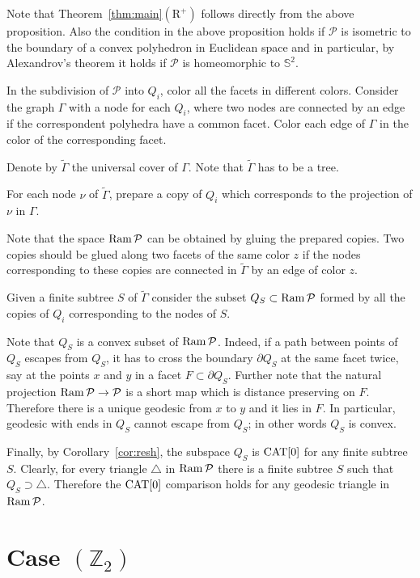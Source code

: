 \documentclass[oneside,a4paper]{article}
\begin{document}
Note that Theorem~\ref{thm:main}$(\mathrm{R}^+)$
follows directly from the above proposition.
Also the condition in the above proposition holds if $\mathcal{P}$ is isometric to the boundary of a convex polyhedron in Euclidean space
and in particular, by Alexandrov's theorem it holds if $\mathcal{P}$ is homeomorphic to $\mathbb{S}^2$.

In the subdivision of $\mathcal{P}$ into $Q_i$,
color all the facets in different colors.
Consider the graph $\Gamma$ with a node for each $Q_i$, where two nodes are connected by an edge if the correspondent polyhedra have a common facet. Color each edge of $\Gamma$ in the color of the corresponding facet.

Denote by $\tilde\Gamma$ the universal cover of $\Gamma$.
Note that $\tilde\Gamma$ has to be a tree.

For each node $\nu$ of $\tilde\Gamma$,  prepare a copy of $Q_i$ which corresponds to the projection of $\nu$ in $\Gamma$.

Note that  the space $\mathop{\rm Ram}\nolimits\mathcal{P}$
can be obtained by gluing the prepared copies.
Two copies should be glued along two facets of the same color $z$
if the nodes corresponding to these copies are connected in $\tilde\Gamma$
by an edge of color $z$.

Given a finite subtree $S$ of $\tilde \Gamma$
consider the subset $Q_S\subset \mathop{\rm Ram}\nolimits\mathcal{P}$
formed by all the copies of $Q_i$ corresponding to the nodes of $S$.

Note that $Q_S$ is a convex subset of $\mathop{\rm Ram}\nolimits\mathcal{P}$.
Indeed, if a path between points of $Q_S$ escapes from $Q_S$,
it has to cross the boundary $\partial Q_S$
at the same facet twice, say at the points $x$ and $y$ in 
a facet $F\subset\partial Q_S$.
Further note that the natural projection $\mathop{\rm Ram}\nolimits\mathcal{P}\to \mathcal{P}$ is a short map which is distance preserving on $F$.
Therefore there is a unique geodesic from $x$ to $y$ and it lies in $F$.
In particular, geodesic with ends in $Q_S$ cannot escape from $Q_S$;
in other words $Q_S$ is convex.


Finally, by Corollary~\ref{cor:resh},
the subspace $Q_S$ is  $\mathrm{CAT}[0]$ for any finite subtree $S$.
Clearly, for every triangle $\triangle$ in $\mathop{\rm Ram}\nolimits\mathcal{P}$
there is a finite subtree $S$ such that $Q_S\supset\triangle$.
Therefore the $\mathrm{CAT}[0]$ comparison holds for any geodesic triangle in $\mathop{\rm Ram}\nolimits\mathcal{P}$.
\qeds

\section{Case $(\mathbb{Z}_2)$}
\end{document}
